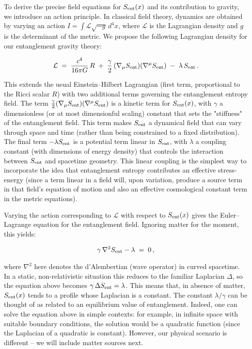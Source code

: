 \documentclass[11pt]{article}
\begin{document}
To derive the precise field equations for $S_{\rm ent}(x)$ and its contribution to gravity, we introduce an action principle. In classical field theory, dynamics are obtained by varying an action $I = \int \mathcal{L}\sqrt{-g}\,d^4x$, where $\mathcal{L}$ is the Lagrangian density and $g$ is the determinant of the metric. We propose the following Lagrangian density for our entanglement gravity theory:

\begin{equation*} 
\mathcal{L} \;=\; \frac{c^4}{16\pi G}\,R \;+\; \frac{\gamma}{2}\,(\nabla_\mu S_{\rm ent})(\nabla^\mu S_{\rm ent}) \;-\; \lambda\,S_{\rm ent} \,. 
\end{equation*}

This extends the usual Einstein–Hilbert Lagrangian (first term, proportional to the Ricci scalar $R$) with two additional terms governing the entanglement entropy field. The term $\frac{\gamma}{2}(\nabla_\mu S_{\rm ent})(\nabla^\mu S_{\rm ent})$ is a kinetic term for $S_{\rm ent}(x)$, with $\gamma$ a dimensionless (or at most dimensionful scaling) constant that sets the "stiffness" of the entanglement field. This term makes $S_{\rm ent}$ a dynamical field that can vary through space and time (rather than being constrained to a fixed distribution). The final term $-\lambda S_{\rm ent}$ is a potential term linear in $S_{\rm ent}$, with $\lambda$ a coupling constant (with dimensions of energy density) that controls the interaction between $S_{\rm ent}$ and spacetime geometry. This linear coupling is the simplest way to incorporate the idea that entanglement entropy contributes an effective stress-energy (since a term linear in a field will, upon variation, produce a source term in that field’s equation of motion and also an effective cosmological constant term in the metric equations).

Varying the action corresponding to $\mathcal{L}$ with respect to $S_{\rm ent}(x)$ gives the Euler–Lagrange equation for the entanglement field. Ignoring matter for the moment, this yields:

\begin{equation}
\gamma\, \nabla^2 S_{\rm ent} - \lambda \;=\; 0 \,,
\end{equation}

where $\nabla^2$ here denotes the d’Alembertian (wave operator) in curved spacetime. In a static, non-relativistic situation this reduces to the familiar Laplacian $\Delta$, so the equation above becomes $\gamma\,\Delta S_{\rm ent} = \lambda$. This means that, in absence of matter, $S_{\rm ent}(x)$ tends to a profile whose Laplacian is a constant. The constant $\lambda/\gamma$ can be thought of as related to an equilibrium value of entanglement. Indeed, one can solve the equation above in simple contexts: for example, in infinite space with suitable boundary conditions, the solution would be a quadratic function (since the Laplacian of a quadratic is constant). However, our physical scenario is different – we will include matter sources next.
\end{document}
